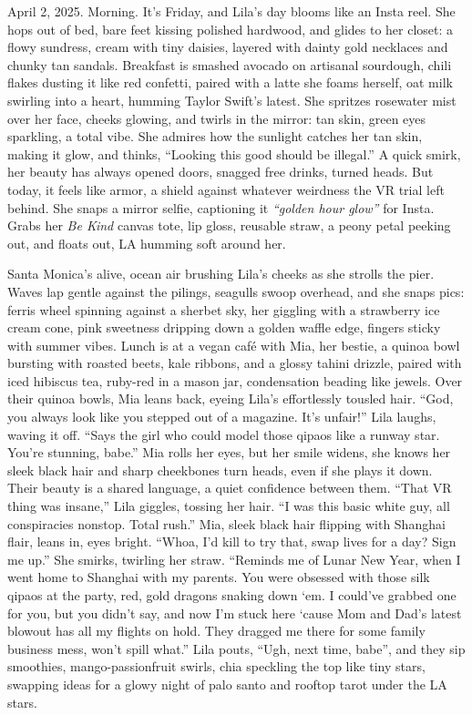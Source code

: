 \documentclass[12pt]{article}
\begin{document}
April 2, 2025. Morning. It’s Friday, and \textnormal{Lila}’s day blooms like an Insta reel. She hops out of bed, bare feet kissing polished hardwood, and glides to her closet: a flowy sundress, cream with tiny daisies, layered with dainty gold necklaces and chunky tan sandals. Breakfast is smashed avocado on artisanal sourdough, chili flakes dusting it like red confetti, paired with a latte she foams herself, oat milk swirling into a heart, humming \textnormal{Taylor Swift}’s latest. She spritzes rosewater mist over her face, cheeks glowing, and twirls in the mirror: tan skin, green eyes sparkling, a total vibe. She admires how the sunlight catches her tan skin, making it glow, and thinks, “Looking this good should be illegal.” A quick smirk, her beauty has always opened doors, snagged free drinks, turned heads. But today, it feels like armor, a shield against whatever weirdness the VR trial left behind. She snaps a mirror selfie, captioning it \textit{“golden hour glow”} for Insta. Grabs her \textit{Be Kind} canvas tote, lip gloss, reusable straw, a peony petal peeking out, and floats out, LA humming soft around her.

Santa Monica’s alive, ocean air brushing \textnormal{Lila}’s cheeks as she strolls the pier. Waves lap gentle against the pilings, seagulls swoop overhead, and she snaps pics: ferris wheel spinning against a sherbet sky, her giggling with a strawberry ice cream cone, pink sweetness dripping down a golden waffle edge, fingers sticky with summer vibes. Lunch is at a vegan café with \textnormal{Mia}, her bestie, a quinoa bowl bursting with roasted beets, kale ribbons, and a glossy tahini drizzle, paired with iced hibiscus tea, ruby-red in a mason jar, condensation beading like jewels. Over their quinoa bowls, \textnormal{Mia} leans back, eyeing \textnormal{Lila}’s effortlessly tousled hair. “God, you always look like you stepped out of a magazine. It’s unfair!” \textnormal{Lila} laughs, waving it off. “Says the girl who could model those qipaos like a runway star. You’re stunning, babe.” \textnormal{Mia} rolls her eyes, but her smile widens, she knows her sleek black hair and sharp cheekbones turn heads, even if she plays it down. Their beauty is a shared language, a quiet confidence between them. “That VR thing was insane,” \textnormal{Lila} giggles, tossing her hair. “I was this basic white guy, all conspiracies nonstop. Total rush.” \textnormal{Mia}, sleek black hair flipping with Shanghai flair, leans in, eyes bright. “Whoa, I’d kill to try that, swap lives for a day? Sign me up.” She smirks, twirling her straw. “Reminds me of Lunar New Year, when I went home to Shanghai with my parents. You were obsessed with those silk qipaos at the party, red, gold dragons snaking down ‘em. I could’ve grabbed one for you, but you didn’t say, and now I’m stuck here ‘cause Mom and Dad’s latest blowout has all my flights on hold. They dragged me there for some family business mess, won’t spill what.” \textnormal{Lila} pouts, “Ugh, next time, babe”, and they sip smoothies, mango-passionfruit swirls, chia speckling the top like tiny stars, swapping ideas for a glowy night of palo santo and rooftop tarot under the LA stars.
\end{document}
